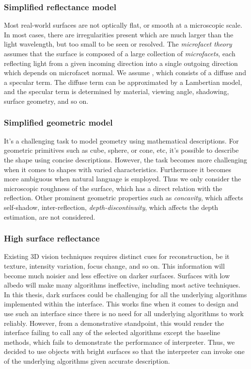 \subsubsection{Simplified reflectance model}
Most real-world surfaces are not optically flat, or smooth at a microscopic scale. In most cases, there are irregularities present which are much larger than the light wavelength, but too small to be seen or resolved. The \textit{microfacet theory} assumes that the surface is composed of a large collection of \textit{microfacets}, each reflecting light from a given incoming direction into a single outgoing direction which depends on microfacet normal. We assume , which consists of a diffuse and a specular term. The diffuse term can be approximated by a Lambertian model, and the specular term is determined by material, viewing angle, shadowing, surface geometry, and so on.

\subsubsection{Simplified geometric model}
It's a challenging task to model geometry using mathematical descriptions. For geometric primitives such as cube, sphere, or cone, etc, it's possible to describe the shape using concise descriptions. However, the task becomes more challenging when it comes to shapes with varied characteristics. Furthermore it becomes more ambiguous when natural language is employed. Thus we only consider the microscopic roughness of the surface, which has a direct relation with the reflection. Other prominent geometric properties such as \textit{concavity}, which affects self-shadow, inter-reflection, \textit{depth-discontinuity}, which affects the depth estimation, are not considered.

\subsubsection{High surface reflectance}
Existing 3D vision techniques requires distinct cues for reconstruction, be it texture, intensity variation, focus change, and so on. This information will become much noisier and less effective on darker surfaces. Surfaces with low albedo will make many algorithms ineffective, including most active techniques. In this thesis, dark surfaces could be challenging for all the underlying algorithms implemented within the interface. This works fine when it comes to design and use such an interface since there is no need for all underlying algorithms to work reliably. However, from a demonstrative standpoint, this would render the interface failing to call any of the selected algorithms except the baseline methods, which fails to demonstrate the performance of interpreter. Thus, we decided to use objects with bright surfaces so that the interpreter can invoke one of the underlying algorithms given accurate description.

